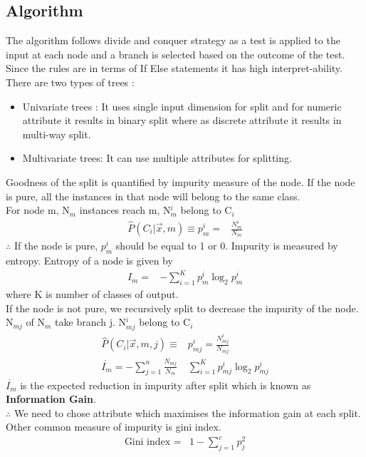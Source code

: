 \documentclass[12pt,letterpaper, onecolumn]{exam}
\begin{document}
\subsection*{Algorithm}
The algorithm follows divide and conquer strategy as a test is applied to the input at each node and a branch is selected based on the outcome of the test. Since the rules are in terms of If Else statements it has high interpret-ability.
There are two types of trees :
\begin{itemize}
\item Univariate trees : It uses single input dimension for split and  for numeric attribute it results in binary split where as discrete attribute it results in multi-way split.
\item Multivariate trees: It can use multiple attributes for splitting.
\end{itemize}
Goodness of the split is quantified by impurity measure of the node. If the node is pure, all the instances in that node will belong to the same class.\\
For node m, N$_{m}$ instances reach m, N$^{i}_{m}$ belong to C$_{i}$
\begin{align}
\hat{P}(C_i | \vec{x},m) \equiv p^i_m = {}& \frac{N^i_m}{N_m}
\end{align}
$\therefore$ If the node is pure, $p^i_m $ should be equal to 1 or 0.
Impurity is measured by entropy. Entropy of a node is given by
\begin{align}
I_m ={}& -\sum_{i=1}^K p^i_m \log_2{p^i_m}
\end{align}
where K is number of classes of output.\\
If the node is not pure, we recursively split to decrease the impurity of the node.\\
 N$_{mj}$ of N$_{m}$ take branch j. N$^i_{mj}$ belong to C$_i$
 \begin{align}
 \hat{P}(C_i | \vec{x},m,j) \equiv {}&p^i_{mj} =  \frac{N^i_{mj}}{N_{mj}}\\
 \acute{I_m} = -\sum_{j = 1}^n\frac{N_{mj}}{N_{m}}{}&\sum_{i=1}^K p^i_{mj} \log_2{p^i_{mj}}
 \end{align}
 $\acute{I_m}$ is the expected reduction in impurity after split which is known as \\\textbf{Information Gain}.\\
 $\therefore$ We need to chose attribute which maximises the information gain at each split.\\
Other common measure of impurity is gini index.
\begin{align}
\text{Gini index } = {}& 1-\sum_{j= 1}^c p_j^2
\end{align}
\end{document}
